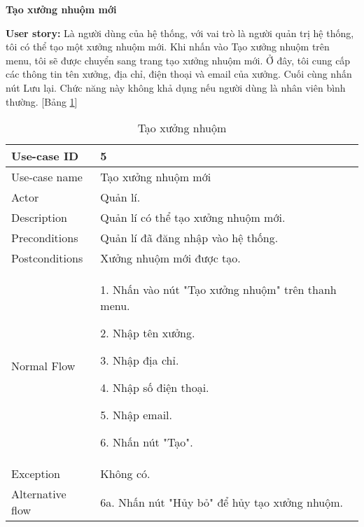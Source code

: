 \textbf{Tạo xưởng nhuộm mới}\par
\textbf{User story:} Là người dùng của hệ thống, với vai trò là người quản trị hệ thống, tôi có thể tạo một xưởng nhuộm mới. Khi nhấn vào Tạo xưởng nhuộm trên menu, tôi sẽ được chuyển sang trang tạo xưởng nhuộm mới. Ở đây, tôi cung cấp các thông tin tên xưởng, địa chỉ, điện thoại và email của xưởng. Cuối cùng nhấn nút Lưu lại. Chức năng này không khả dụng nếu người dùng là nhân viên bình thường. [Bảng \ref{bang16}]
\begin{table}[H]
    \centering
    \begin{tabular}{|m{3cm}|m{10cm}|}
    \hline 
        Use-case ID & 5\\ \hline
        Use-case name & Tạo xưởng nhuộm mới\\ \hline
        Actor & Quản lí.\\ \hline
        Description & Quản lí có thể tạo xưởng nhuộm mới.\\ \hline
        Preconditions & Quản lí đã đăng nhập vào hệ thống.\\ \hline
        Postconditions & Xưởng nhuộm mới được tạo.\\ \hline
        Normal Flow & 
        1. Nhấn vào nút "Tạo xưởng nhuộm" trên thanh menu.\par 
        2. Nhập tên xưởng.\par
        3. Nhập địa chỉ.\par
        4. Nhập số điện thoại.\par
        5. Nhập email.\par
        6. Nhấn nút "Tạo".
        \\ \hline
        Exception & Không có.
        \\ \hline
        Alternative flow & 
        6a. Nhấn nút "Hủy bỏ" để hủy tạo xưởng nhuộm.
        \\ 
    \hline 
    \end{tabular}
    \caption{Tạo xưởng nhuộm}
    \label{bang16}
\end{table}


